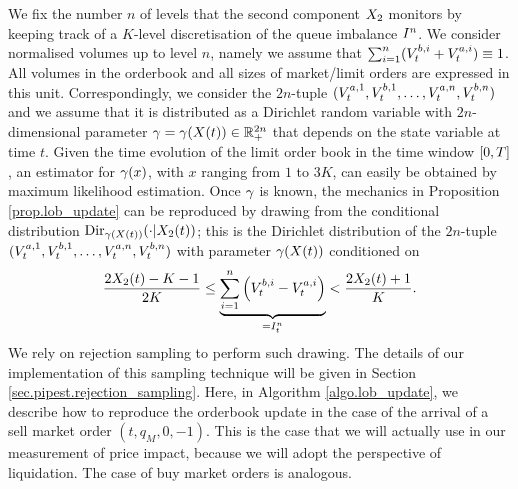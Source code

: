 \documentclass[10pt, article,table]{article}
\begin{document}
We fix the number $n$ of levels that the second component $\stateVariable_2$ monitors by keeping track of a $K$-level discretisation of the queue imbalance $\volumeImbalance^n$. We consider normalised volumes up to level $n$, namely we assume that $\sum_{i=1}^{n} (\nthBestBidVolume[i]_t + \nthBestAskVolume[i]_t) \equiv 1$. All volumes in the orderbook and all sizes of market/limit orders are expressed in this unit.  Correspondingly, we consider the $2n$-tuple $(\nthBestAskVolume[1]_t,\nthBestBidVolume[1]_t, \dots, \nthBestAskVolume[n]_t,\nthBestBidVolume[n]_t)$ and we assume that it is distributed as a Dirichlet random variable with $2n$-dimensional parameter $\dirichletParam=\dirichletParam(\stateVariable(t)) \in \R_{+}^{2n}$ that depends on the state variable at time $t$. Given the time evolution of the limit order book in the time window $\timeWindow$, an estimator for $\dirparam(x)$, with $x$ ranging from $1$ to $3K$, can easily be obtained by maximum likelihood estimation. Once $\dirparam$ is known, the mechanics in Proposition \ref{prop.lob_update} can be reproduced by drawing from the conditional distribution $\text{Dir}_{\dirichletParam(\stateVariable(t))}(\cdot \vert \stateVariable_2 (t) )$; this is the Dirichlet distribution of  the $2n$-tuple $(\nthBestAskVolume[1]_t,\nthBestBidVolume[1]_t, \dots, \nthBestAskVolume[n]_t,\nthBestBidVolume[n]_t)$ with parameter $\dirparam(\stateVariable(t))$ conditioned on 
\begin{equation*}
 \frac{2\stateVariable_2(t) - K - 1}{2K}
 \leq 
 \underbrace{\sum_{i=1}^{n} \left( \nthBestBidVolume[i]_t - \nthBestAskVolume[i]_t \right)}_{= \volumeImbalance^n_t}
 <
 \frac{2\stateVariable_2(t) +1}{K}.
\end{equation*}
We rely on rejection sampling to perform such drawing. The details of our implementation of this sampling technique will be given in Section \ref{sec.pipest.rejection_sampling}. 
Here, in Algorithm \ref{algo.lob_update}, we describe how to reproduce the orderbook update in the case of the arrival of a sell market order $(t,q_M, 0, -1)$. This is the case that we will actually use in our measurement of price impact, because we will adopt the perspective of liquidation. The case of buy market orders is analogous. 
\end{document}

